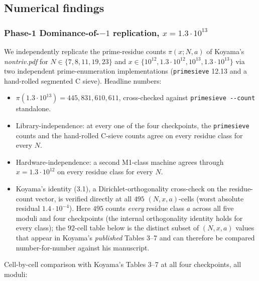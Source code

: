 \subsection{Numerical findings}

\subsubsection{Phase-1 Dominance-of-\(-1\) replication, \(x = 1.3 \cdot 10^{13}\)}

We independently replicate the prime-residue counts \(\pi(x; N, a)\)
of Koyama's \emph{nontriv.pdf} for \(N \in \{7, 8, 11, 19, 23\}\) and
\(x \in \{10^{12}, 1.3\cdot 10^{12}, 10^{13}, 1.3\cdot 10^{13}\}\) via
two independent prime-enumeration implementations (\texttt{primesieve} 12.13
and a hand-rolled segmented C sieve). Headline numbers:

\begin{itemize}
\item
  \(\pi(1.3 \cdot 10^{13}) = 445{,}831{,}610{,}611\), cross-checked
  against \texttt{primesieve\ -\/-count} standalone.
\item
  Library-independence: at every one of the four checkpoints, the
  \texttt{primesieve} counts and the hand-rolled C-sieve counts agree on
  every residue class for every \(N\).
\item
  Hardware-independence: a second M1-class machine agrees through
  \(x = 1.3 \cdot 10^{12}\) on every residue class for every \(N\).
\item
  Koyama's identity (3.1), a Dirichlet-orthogonality cross-check on
  the residue-count vector, is verified directly at all \(495\)
  \((N, x, a)\)-cells (worst absolute residual \(1.4 \cdot 10^{-4}\)).
  Here \(495\) counts \emph{every} residue class \(a\) across all five
  moduli and four checkpoints (the internal orthogonality identity
  holds for every class); the \(92\)-cell table below is the
  distinct subset of \((N, x, a)\) values that appear in Koyama's
  \emph{published} Tables 3--7 and can therefore be compared
  number-for-number against his manuscript.
\end{itemize}

Cell-by-cell comparison with Koyama's Tables 3--7 at all four
checkpoints, all moduli:

